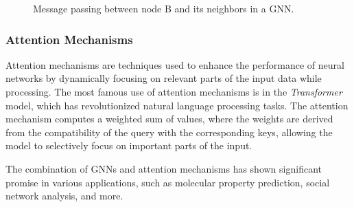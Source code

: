 \documentclass{article}
\begin{document}
\begin{figure}[H]
    \centering
    \caption{Message passing between node B and its neighbors in a GNN.}
    \label{fig:gnn}
\end{figure}




\subsubsection{Attention Mechanisms}

Attention mechanisms are techniques used to enhance the performance of neural networks by dynamically focusing on relevant parts of the input data while processing. The most famous use of attention mechanisms is in the \emph{Transformer} model, which has revolutionized natural language processing tasks. The attention mechanism computes a weighted sum of values, where the weights are derived from the compatibility of the query with the corresponding keys, allowing the model to selectively focus on important parts of the input.

The combination of GNNs and attention mechanisms has shown significant promise in various applications, such as molecular property prediction, social network analysis, and more.
\end{document}
